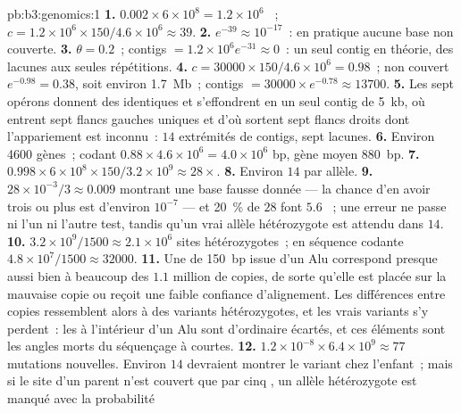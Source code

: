 \begin{solution}{pb:b3:genomics:1}
\textbf{1.} $0.002\times 6\times 10^{8} = 1.2\times 10^{6}$ ~;
$c = 1.2\times 10^{6}\times 150/4.6\times 10^{6} \approx 39$.
\textbf{2.} $e^{-39} \approx 10^{-17}$~: en pratique aucune base non
couverte.
\textbf{3.} $\theta = 0.2$~; contigs $= 1.2\times 10^{6} e^{-31} \approx
0$~: un seul contig en théorie, des lacunes aux seules répétitions.
\textbf{4.} $c = \num{30000}\times 150/4.6\times 10^{6} = 0.98$~; non
couvert $e^{-0.98} = 0.38$, soit environ \qty{1.7}{Mb}~; contigs $= \num{30000}
\times e^{-0.78} \approx \num{13700}$.
\textbf{5.} Les sept opérons donnent des  identiques et
s'effondrent en un seul contig de \qty{5}{kb}, où entrent sept flancs
gauches uniques et d'où sortent sept flancs droits dont l'appariement
est inconnu~: $14$ extrémités de contigs, sept lacunes.
\textbf{6.} Environ \num{4600} gènes~; codant $0.88\times 4.6\times 10^{6}
= 4.0\times 10^{6}$ bp, gène moyen \qty{880}{bp}.
\textbf{7.} $0.998\times 6\times 10^{8}\times 150/3.2\times 10^{9}
\approx 28\times$.
\textbf{8.} Environ $14$  par allèle.
\textbf{9.} $28\times 10^{-3}/3 \approx 0.009$  montrant une base
fausse donnée --- la chance d'en avoir trois ou plus est d'environ
$10^{-7}$ --- et \qty{20}{\%} de $28$ font $5.6$ ~; une erreur
ne passe ni l'un ni l'autre test, tandis qu'un vrai allèle hétérozygote
est attendu dans $14$.
\textbf{10.} $3.2\times 10^{9}/1500 \approx 2.1\times 10^{6}$ sites
hétérozygotes~; en séquence codante $4.8\times 10^{7}/1500 \approx
\num{32000}$.
\textbf{11.} Une  de \qty{150}{bp} issue d'un Alu correspond
presque aussi bien à beaucoup des $1.1$ million de copies, de sorte
qu'elle est placée sur la mauvaise copie ou reçoit une faible confiance
d'alignement. Les différences entre copies ressemblent alors à des
variants hétérozygotes, et les vrais variants s'y perdent~: les  à l'intérieur d'un Alu sont d'ordinaire écartés, et ces
éléments sont les angles morts du séquençage à  courtes.
\textbf{12.} $1.2\times 10^{-8}\times 6.4\times 10^{9} \approx 77$
mutations nouvelles. Environ $14$  devraient montrer le variant
chez l'enfant~; mais si le site d'un parent n'est couvert que par cinq
, un allèle hétérozygote est manqué avec la probabilité

\end{solution}
